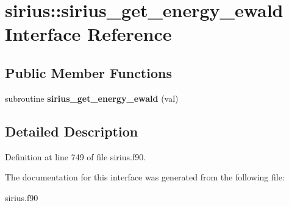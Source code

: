 \hypertarget{interfacesirius_1_1sirius__get__energy__ewald}{}\section{sirius\+:\+:sirius\+\_\+get\+\_\+energy\+\_\+ewald Interface Reference}
\label{interfacesirius_1_1sirius__get__energy__ewald}
\subsection*{Public Member Functions}
\begin{DoxyCompactItemize}
\item 
\hypertarget{interfacesirius_1_1sirius__get__energy__ewald_a6d192dcf5af6f189c02c86e0e167d996}{}subroutine {\bfseries sirius\+\_\+get\+\_\+energy\+\_\+ewald} (val)\label{interfacesirius_1_1sirius__get__energy__ewald_a6d192dcf5af6f189c02c86e0e167d996}

\end{DoxyCompactItemize}


\subsection{Detailed Description}


Definition at line 749 of file sirius.\+f90.



The documentation for this interface was generated from the following file\+:\begin{DoxyCompactItemize}
\item 
sirius.\+f90\end{DoxyCompactItemize}
